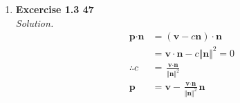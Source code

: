 \begin{enumerate}
\begin{proof}
\begin{align*}
			&= \frac{|d_2 - d_1|}{\Vert\textbf{n}\Vert}
			\end{align*}
		\end{proof}
	\item \textbf{Excercise 1.3 47} \\
		\textit{Solution.}
			\begin{align*}
				\textbf{p}\cdot\textbf{n}
				&= (\textbf{v}-c\textbf{n})\cdot\textbf{n} \\
				&= \textbf{v}\cdot\textbf{n} - c\Vert\textbf{n}\Vert^2 = 0 \\
				\therefore c &= \frac{\textbf{v}\cdot\textbf{n}}{\Vert\textbf{n}\Vert^2} \\
				\textbf{p} &= \textbf{v} - \frac{\textbf{v}\cdot\textbf{n}}{\Vert\textbf{n}\Vert^2}\textbf{n}
			\end{align*}
\end{enumerate}